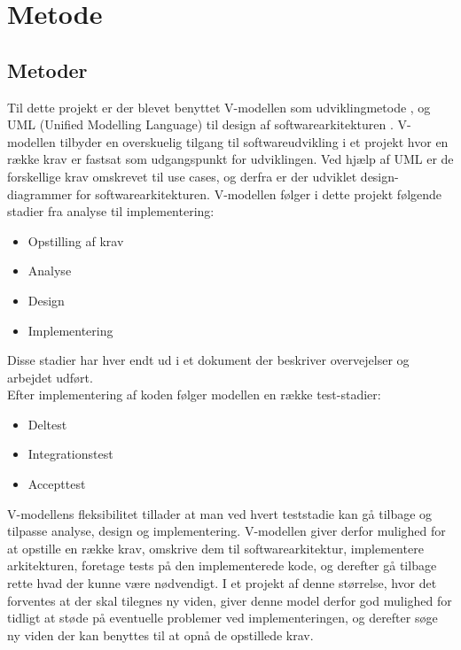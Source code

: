 \documentclass[rapport.tex]{subfiles}
\begin{document}
\section{Metode}
	\subsection{Metoder}
	Til dette projekt er der blevet benyttet V-modellen som udviklingmetode \cite{Vmodel}, og UML (Unified Modelling Language) \cite{UML} til design af softwarearkitekturen . V-modellen tilbyder en overskuelig tilgang til softwareudvikling i et projekt hvor en række krav er fastsat som udgangspunkt for udviklingen. Ved hjælp af UML er de forskellige krav omskrevet til use cases, og derfra er der udviklet design-diagrammer for softwarearkitekturen. 
	V-modellen følger i dette projekt følgende stadier fra analyse til implementering:
	\begin{itemize}
		\item Opstilling af krav
		\item Analyse
		\item Design
		\item Implementering
	\end{itemize}
	Disse stadier har hver endt ud i et dokument der beskriver overvejelser og arbejdet udført. \\
	
	Efter implementering af koden følger modellen en række test-stadier:
	\begin{itemize}
		\item Deltest
		\item Integrationstest
		\item Accepttest
	\end{itemize}
	
	V-modellens fleksibilitet tillader at man ved hvert teststadie kan gå tilbage og tilpasse analyse, design og implementering. 
	V-modellen giver derfor mulighed for at opstille en række krav, omskrive dem til softwarearkitektur, implementere arkitekturen, foretage tests på den implementerede kode, og derefter gå tilbage rette hvad der kunne være nødvendigt. 
	I et projekt af denne størrelse, hvor det forventes at der skal tilegnes ny viden, giver denne model derfor god mulighed for tidligt at støde på eventuelle problemer ved implementeringen, og derefter søge ny viden der kan benyttes til at opnå de opstillede krav. 
	
\end{document}

